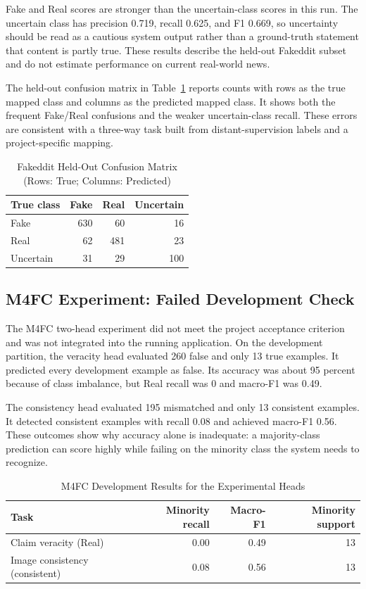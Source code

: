 \documentclass[conference]{IEEEtran}
\begin{document}
Fake and Real scores are stronger than the uncertain-class scores in this run. The uncertain class has precision 0.719, recall 0.625, and F1 0.669, so uncertainty should be read as a cautious system output rather than a ground-truth statement that content is partly true. These results describe the held-out Fakeddit subset and do not estimate performance on current real-world news.

The held-out confusion matrix in Table~\ref{tab:confusion} reports counts with rows as the true mapped class and columns as the predicted mapped class. It shows both the frequent Fake/Real confusions and the weaker uncertain-class recall. These errors are consistent with a three-way task built from distant-supervision labels and a project-specific mapping.

\begin{table}[t]
\caption{Fakeddit Held-Out Confusion Matrix (Rows: True; Columns: Predicted)}
\label{tab:confusion}
\centering
\begin{tabular}{lrrr}
\hline
True class & Fake & Real & Uncertain\\
\hline
Fake & 630 & 60 & 16\\
Real & 62 & 481 & 23\\
Uncertain & 31 & 29 & 100\\
\hline
\end{tabular}
\end{table}

\subsection{M4FC Experiment: Failed Development Check}
The M4FC two-head experiment did not meet the project acceptance criterion and was not integrated into the running application. On the development partition, the veracity head evaluated 260 false and only 13 true examples. It predicted every development example as false. Its accuracy was about 95 percent because of class imbalance, but Real recall was 0 and macro-F1 was 0.49.

The consistency head evaluated 195 mismatched and only 13 consistent examples. It detected consistent examples with recall 0.08 and achieved macro-F1 0.56. These outcomes show why accuracy alone is inadequate: a majority-class prediction can score highly while failing on the minority class the system needs to recognize.

\begin{table}[t]
\caption{M4FC Development Results for the Experimental Heads}
\label{tab:m4fc}
\centering
\begin{tabular}{lrrr}
\hline
Task & Minority recall & Macro-F1 & Minority support\\
\hline
Claim veracity (Real) & 0.00 & 0.49 & 13\\
Image consistency (consistent) & 0.08 & 0.56 & 13\\
\hline
\end{tabular}
\end{table}
\end{document}
